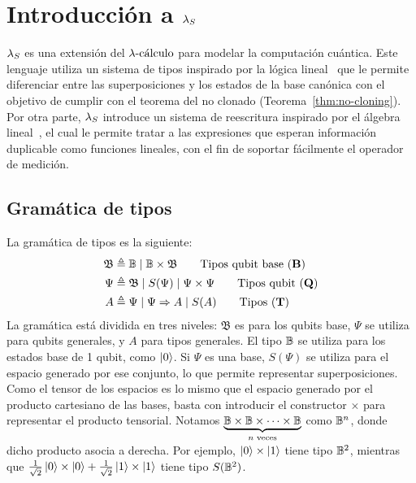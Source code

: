 \chapter{Introducción a \texorpdfstring{\( \lambdas \)}{Lambda S}}\label{Chapter4}

\( \lambdas \) es una extensión del \( \lambdacalculus \) para modelar la computación cuántica. Este lenguaje utiliza un sistema de tipos inspirado por la lógica lineal~\cite{abramsky} que le permite diferenciar
entre las superposiciones y los estados de la base canónica con el objetivo de cumplir con el teorema del no clonado (Teorema~\ref{thm:no-cloning}). Por otra parte, \( \lambdas \) introduce un sistema de reescritura inspirado por el álgebra lineal~\cite{arrighi3, arrighi4}, el cual le permite tratar a las expresiones que esperan información duplicable como funciones lineales, con el fin de soportar fácilmente el operador de medición.

\section{Gramática de tipos}

La gramática de tipos es la siguiente:
\begin{align*}
	\mathfrak{B} & \triangleq \qubittype \mid \qubittype \times \mathfrak{B} \tag*{Tipos qubit base (\( \mathbf{B} \))} \\
	\Psi         & \triangleq \mathfrak{B} \mid S(\Psi) \mid \Psi \times \Psi \tag*{Tipos qubit (\( \mathbf{Q} \))}       \\
	A            & \triangleq \Psi \mid \Psi \Rightarrow A \mid S(A) \tag*{Tipos (\( \mathbf{T} \))}
\end{align*}
La gramática está dividida en tres niveles: \( \mathfrak{B} \) es para los qubits base, \( \Psi \) se utiliza para qubits generales, y \( A \) para tipos generales.
El tipo \( \qubittype \) se utiliza para los estados base de 1 qubit, como \( \ket{0} \). Si \( \Psi \) es una base, \( S(\Psi) \) se utiliza para el espacio generado por ese conjunto, lo que permite representar superposiciones. Como el tensor de los espacios es lo mismo que el espacio generado por el producto cartesiano de las bases, basta con introducir el constructor \( \times \) para representar el producto tensorial. Notamos \( \underbrace{\qubittype \times \qubittype \times \cdots \times \qubittype}_{n \text{ veces}} \) como \( \qubittype^n \), donde dicho producto asocia a derecha. Por ejemplo, \( \ket{0} \times \ket{1} \) tiene tipo \( \qubittype^2 \), mientras que \( \frac{1}{\sqrt{2}} \ket{0} \times \ket{0} + \frac{1}{\sqrt{2}} \ket{1} \times \ket{1} \) tiene tipo \( S(\qubittype^2) \).

